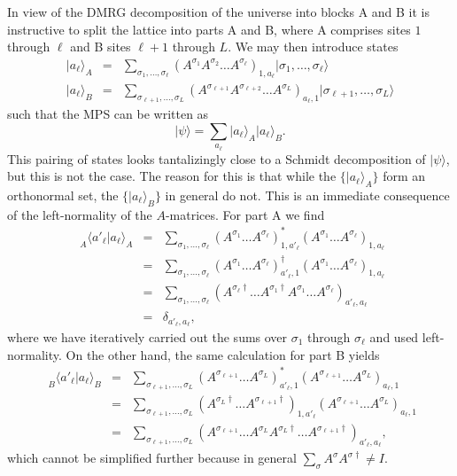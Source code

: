 \documentclass[a4paper,10pt,oneside,onecolumn,1p,times]{elsarticle}
\newcommand{\ket}[1]{\mbox{$| #1  \rangle$}}
\newcommand{\braket}[2]{\mbox{$\langle #1  | #2 \rangle$}} 	%
\begin{document}
In view of the DMRG decomposition of the universe into blocks A and B it is instructive to split the lattice into parts A and B, where A comprises sites $1$ through $\ell$ and B sites $\ell+1$ through $L$. We may then introduce states
\begin{eqnarray}
\ket{a_\ell}_A &=& \sum_{\sigma_1,\ldots,\sigma_\ell} (A^{\sigma_1} A^{\sigma_2} \ldots A^{\sigma_\ell})_{1,a_\ell} \ket{\sigma_1,\ldots,\sigma_\ell} \\
\ket{a_\ell}_B &=& \sum_{\sigma_{\ell+1},\ldots,\sigma_L} (A^{\sigma_{\ell+1}} A^{\sigma_{\ell+2}} \ldots A^{\sigma_L})_{a_\ell,1} \ket{\sigma_{\ell+1},\ldots,\sigma_L}
\end{eqnarray}
such that the MPS can be written as
\begin{equation}
\ket{\psi} = \sum_{a_\ell} \ket{a_\ell}_A \ket{a_\ell}_B . 
\end{equation}
This pairing of states looks tantalizingly close to a Schmidt decomposition of $\ket{\psi}$, but this is not the case. The reason for this is that while the $\{ \ket{a_\ell}_A \}$ form an orthonormal set, the $\{ \ket{a_\ell}_B \}$ in general do not. This is an immediate consequence of the left-normality of the $A$-matrices. For part A we find 
\begin{eqnarray*}
\phantom\langle_A \braket{a'_\ell}{a_\ell}_A &=& \sum_{\sigma_1,\ldots,\sigma_\ell} (A^{\sigma_1} \ldots A^{\sigma_\ell})^*_{1,a'_\ell} (A^{\sigma_1} \ldots A^{\sigma_\ell})_{1,a_\ell} \\
&=& \sum_{\sigma_1,\ldots,\sigma_\ell} (A^{\sigma_1} \ldots A^{\sigma_\ell})^\dagger_{a'_\ell,1} (A^{\sigma_1} \ldots A^{\sigma_\ell})_{1,a_\ell} \\
&=& \sum_{\sigma_1,\ldots,\sigma_\ell} (A^{\sigma_\ell\dagger} \ldots A^{\sigma_1\dagger}A^{\sigma_1} \ldots A^{\sigma_\ell})_{a'_\ell,a_\ell} \\
&=& \delta_{a'_\ell,a_\ell} ,
\end{eqnarray*}
where we have iteratively carried out the sums over $\sigma_1$ through $\sigma_\ell$ and used left-normality. On the other hand, the same calculation for part B yields
\begin{eqnarray*}
\phantom\langle_B \braket{a'_\ell}{a_\ell}_B &=& \sum_{\sigma_{\ell+1},\ldots,\sigma_L} (A^{\sigma_{\ell+1}} \ldots A^{\sigma_L})^*_{a'_\ell,1} (A^{\sigma_{\ell+1}} \ldots A^{\sigma_L})_{a_\ell,1} \\
&=& \sum_{\sigma_{\ell+1},\ldots,\sigma_L} (A^{\sigma_L\dagger} \ldots A^{\sigma_{\ell+1}\dagger})_{1,a'_\ell} (A^{\sigma_{\ell+1}} \ldots A^{\sigma_L})_{a_\ell,1} \\
&=& \sum_{\sigma_{\ell+1},\ldots,\sigma_L} (A^{\sigma_{\ell+1}} \ldots A^{\sigma_L}A^{\sigma_L\dagger} \ldots A^{\sigma_{\ell+1}\dagger})_{a'_\ell,a_\ell},
\end{eqnarray*}
which cannot be simplified further because in general $\sum_\sigma A^\sigma A^{\sigma\dagger} \neq I$.
\end{document}
